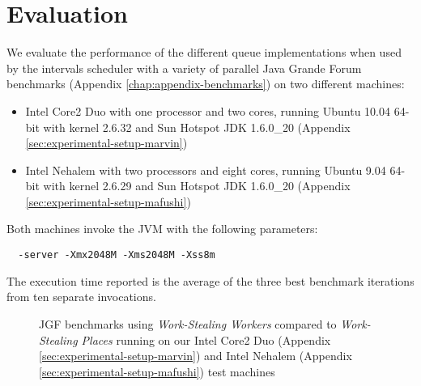 
\chapter{Evaluation}
\label{chap:locality-evaluation}

We evaluate the performance of the different queue implementations
when used by the intervals scheduler with a variety of parallel Java
Grande Forum benchmarks (Appendix \ref{chap:appendix-benchmarks}) on
two different machines:

\begin{itemize}
\item Intel Core2 Duo with one processor and two cores, running Ubuntu
  10.04 64-bit with kernel 2.6.32 and Sun Hotspot JDK 1.6.0\_20
  (Appendix \ref{sec:experimental-setup-marvin})
\item Intel Nehalem with two processors and eight cores, running
  Ubuntu 9.04 64-bit with kernel 2.6.29 and Sun Hotspot JDK 1.6.0\_20
  (Appendix \ref{sec:experimental-setup-mafushi})
\end{itemize}

Both machines invoke the JVM with the following parameters:

\begin{lstlisting}
  -server -Xmx2048M -Xms2048M -Xss8m
\end{lstlisting}

The execution time reported is the average of the three best benchmark
iterations from ten separate invocations.

\begin{figure}[!ht]
  \centering
  \caption[Work-Stealing Workers compared to Work-Stealing Places]{JGF
    benchmarks using \emph{Work-Stealing Workers} compared to
    \emph{Work-Stealing Places} running on our Intel Core2 Duo
    (Appendix \ref{sec:experimental-setup-marvin}) and Intel Nehalem
    (Appendix \ref{sec:experimental-setup-mafushi}) test machines}
  \label{fig:queues-performance-threads}
\end{figure}

